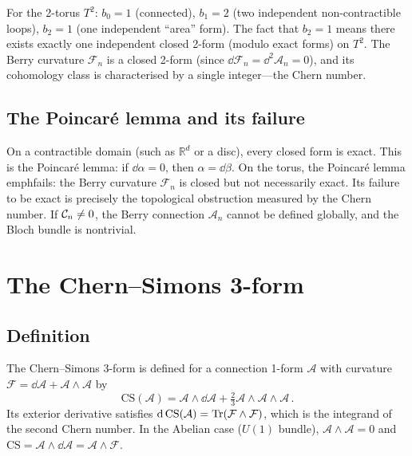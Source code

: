 For the 2-torus $T^2$: $b_0=1$ (connected), $b_1=2$ (two independent
non-contractible loops), $b_2=1$ (one independent ``area'' form).
The fact that $b_2=1$ means there exists exactly one independent
closed 2-form (modulo exact forms) on $T^2$.  The Berry curvature
$\mathcal{F}_n$ is a closed 2-form (since $\dd\mathcal{F}_n
=\dd^2\mathcal{A}_n=0$), and its cohomology class is characterised by
a single integer---the Chern number.

\subsection{The Poincar\'e lemma and its failure}
\label{sec:appB-poincare}

On a contractible domain (such as $\mathbb{R}^d$ or a disc), every
closed form is exact.  This is the Poincar\'e lemma: if
$\dd\alpha=0$, then $\alpha=\dd\beta$.  On the torus, the Poincar\'e
lemma \\emph{fails}: the Berry curvature $\mathcal{F}_n$ is closed but
not necessarily exact.  Its failure to be exact is precisely the
topological obstruction measured by the Chern number.  If $\mathcal{C}_n
\neq 0$, the Berry connection $\mathcal{A}_n$ cannot be defined
globally, and the Bloch bundle is nontrivial.

\section{The Chern--Simons 3-form} \cite{nittis2020equivalence}
\label{sec:appB-chern-simons}

\subsection{Definition}
\label{sec:appB-cs-def}

The Chern--Simons 3-form is defined for a connection 1-form
$\mathcal{A}$ with curvature $\mathcal{F}=\dd\mathcal{A}
+\mathcal{A}\wedge\mathcal{A}$ by
\begin{equation}\label{eq:appB-cs-form}
  \mathrm{CS}(\mathcal{A})
  = \mathcal{A}\wedge\dd\mathcal{A}
  + \tfrac{2}{3}\mathcal{A}\wedge\mathcal{A}\wedge\mathcal{A}\,.
\end{equation}
Its exterior derivative satisfies
$\mathrm{d}\,\mathrm{CS}(\mathcal{A})=\operatorname{Tr}(\mathcal{F}\wedge\mathcal{F})$,
which is the integrand of the second Chern number.  In the Abelian
case ($U(1)$ bundle), $\mathcal{A}\wedge\mathcal{A}=0$ and
$\mathrm{CS}=\mathcal{A}\wedge\dd\mathcal{A}
=\mathcal{A}\wedge\mathcal{F}$.

